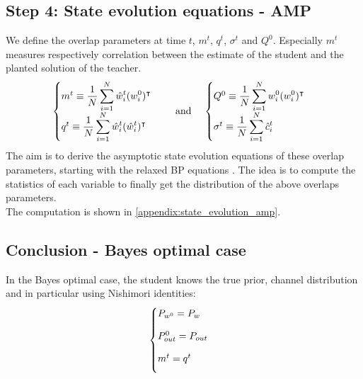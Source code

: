 \documentclass[aip,jmp,amsmath,amssymb,reprint]{revtex4}
\begin{document}
\newpage
\subsection{Step 4: State evolution equations - AMP}
We define the overlap parameters at time $t$, $m^t$, $q^t$, $\sigma^t$ and $Q^0$. Especially $m^t$ measures respectively correlation between the estimate of the student and the planted solution of the teacher.
\begin{align}
	\begin{cases}
	m^t \equiv \displaystyle \frac{1}{N} \sum_{i=1}^N \hat{w}^t_i(w^0_i)^\intercal \\
	q^t \equiv \displaystyle \frac{1}{N} \sum_{i=1}^N \hat{w}^t_i(\hat{w}^{t}_i)^\intercal  
	\end{cases}
	\hspace{0.3cm} \textrm{ and } \hspace{0.3cm}
	\begin{cases}
	Q^0 \equiv \displaystyle \frac{1}{N} \sum_{i=1}^N w^0_i(w^0_i)^\intercal \\ 
	\sigma^t \equiv \displaystyle \frac{1}{N} \sum_{i=1}^N \hat{c}_{i}^{t} \\
	\end{cases}
	\label{amp_overlaps}
\end{align}
The aim is to derive the asymptotic state evolution equations of these overlap parameters, starting with the relaxed BP equations \Eq{\ref{supp:relaxed_BP}}. The idea is to compute the statistics of each variable to finally get the distribution of the above overlaps parameters.\\

The computation is shown in \ref{appendix:state_evolution_amp}.

\subsection{Conclusion - Bayes optimal case}
In the Bayes optimal case, the student knows the true prior, channel distribution and in particular using Nishimori identities:
\begin{align*}
	\begin{cases}
		P_{w^0} = P_w \spacecase
		P^0_{out} = P_{out} \spacecase
		m^t = q^t \spacecase
	\end{cases}
\end{align*}
\end{document}
